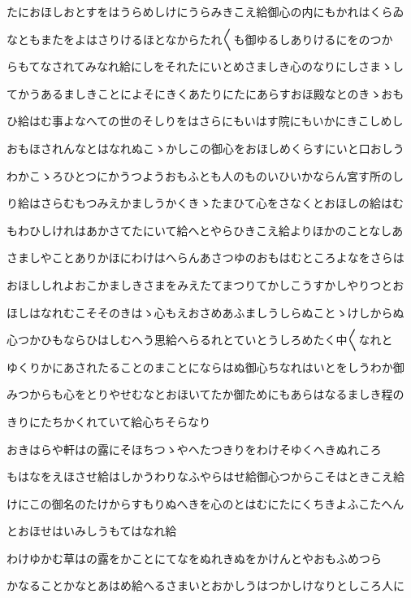 \documentclass[a4paper,11pt,landscape]{ltjtarticle}
\begin{document}
たにおほしおとすをはうらめしけにうらみきこえ給御心の内にもかれはくらゐ
\par\medskip
なともまたをよはさりけるほとなからたれ〱も御ゆるしありけるにをのつか
\par\medskip
らもてなされてみなれ給にしをそれたにいとめさましき心のなりにしさまゝし
\par\medskip
てかうあるましきことによそにきくあたりにたにあらすおほ殿なとのきゝおも
\par\medskip
ひ給はむ事よなへての世のそしりをはさらにもいはす院にもいかにきこしめし
\par\medskip
おもほされんなとはなれぬこゝかしこの御心をおほしめくらすにいと口おしう
\par\medskip
わかこゝろひとつにかうつようおもふとも人のものいひいかならん宮す所のし
\par\medskip
り給はさらむもつみえかましうかくきゝたまひて心をさなくとおほしの給はむ
\par\medskip
もわひしけれはあかさてたにいて給へとやらひきこえ給よりほかのことなしあ
\par\medskip
さましやことありかほにわけはへらんあさつゆのおもはむところよなをさらは
\par\medskip
おほししれよおこかましきさまをみえたてまつりてかしこうすかしやりつとお
\par\medskip
ほしはなれむこそそのきはゝ心もえおさめあふましうしらぬことゝけしからぬ
\par\medskip
心つかひもならひはしむへう思給へらるれとていとうしろめたく中〱なれと
\par\medskip
ゆくりかにあされたることのまことにならはぬ御心ちなれはいとをしうわか御
\par\medskip
みつからも心をとりやせむなとおほいてたか御ためにもあらはなるましき程の
\par\medskip
きりにたちかくれていて給心ちそらなり
\par\medskip
おきはらや軒はの露にそほちつゝやへたつきりをわけそゆくへきぬれころ
\par\medskip
もはなをえほさせ給はしかうわりなふやらはせ給御心つからこそはときこえ給
\par\medskip
けにこの御名のたけからすもりぬへきを心のとはむにたにくちきよふこたへん
\par\medskip
とおほせはいみしうもてはなれ給
\par\medskip
わけゆかむ草はの露をかことにてなをぬれきぬをかけんとやおもふめつら
\par\medskip
かなることかなとあはめ給へるさまいとおかしうはつかしけなりとしころ人に
\par\medskip
\end{document}
